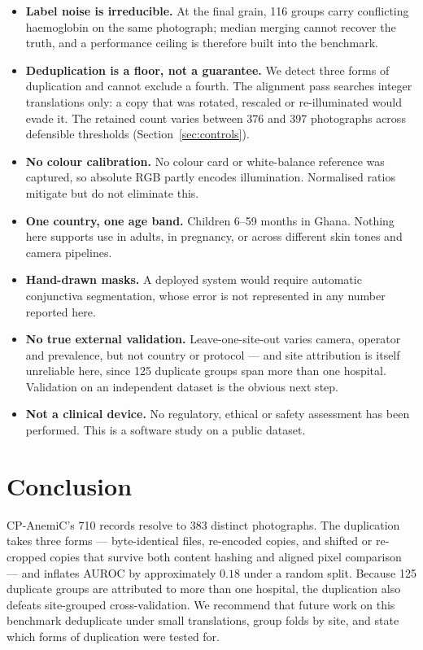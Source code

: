 \documentclass[11pt,a4paper]{article}
\newcommand{\auroc}{AUROC}
\begin{document}
\begin{itemize}
  \item \textbf{Label noise is irreducible.} At the final grain, 116 groups carry conflicting
        haemoglobin on the same photograph; median merging cannot recover the truth, and a
        performance ceiling is therefore built into the benchmark.
  \item \textbf{Deduplication is a floor, not a guarantee.} We detect three forms of
        duplication and cannot exclude a fourth. The alignment pass searches integer
        translations only: a copy that was rotated, rescaled or re-illuminated would evade it.
        The retained count varies between 376 and 397 photographs across defensible
        thresholds (Section~\ref{sec:controls}).
  \item \textbf{No colour calibration.} No colour card or white-balance reference was
        captured, so absolute RGB partly encodes illumination. Normalised ratios mitigate
        but do not eliminate this.
  \item \textbf{One country, one age band.} Children 6--59 months in Ghana. Nothing here
        supports use in adults, in pregnancy, or across different skin tones and camera
        pipelines.
  \item \textbf{Hand-drawn masks.} A deployed system would require automatic conjunctiva
        segmentation, whose error is not represented in any number reported here.
  \item \textbf{No true external validation.} Leave-one-site-out varies camera, operator and
        prevalence, but not country or protocol --- and site attribution is itself unreliable
        here, since 125 duplicate groups span more than one hospital. Validation on an
        independent dataset is the obvious next step.
  \item \textbf{Not a clinical device.} No regulatory, ethical or safety assessment has been
        performed. This is a software study on a public dataset.
\end{itemize}

\section{Conclusion}

CP-AnemiC's 710 records resolve to 383 distinct photographs. The duplication takes three forms
--- byte-identical files, re-encoded copies, and shifted or re-cropped copies that survive both
content hashing and aligned pixel comparison --- and inflates \auroc{} by approximately $0.18$
under a random split. Because 125 duplicate groups are attributed to more than one hospital, the
duplication also defeats site-grouped cross-validation. We recommend that future work on this
benchmark deduplicate under small translations, group folds by site, and state which forms of
duplication were tested for.
\end{document}
